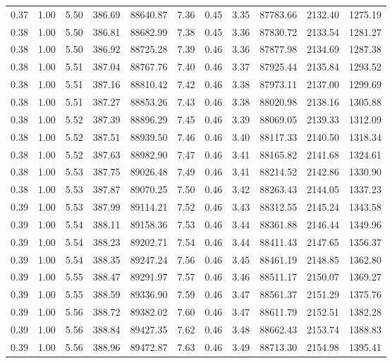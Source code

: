 \begin{table}[!ht]
\begin{tabular}{rrrrrrrrrrr}
0.37 & 1.00 & 5.50 & 386.69 & 88640.87 & 7.36 & 0.45 & 3.35 & 87783.66 & 2132.40 & 1275.19 \\
0.38 & 1.00 & 5.50 & 386.81 & 88682.99 & 7.38 & 0.45 & 3.36 & 87830.72 & 2133.54 & 1281.27 \\
0.38 & 1.00 & 5.50 & 386.92 & 88725.28 & 7.39 & 0.46 & 3.36 & 87877.98 & 2134.69 & 1287.38 \\
0.38 & 1.00 & 5.51 & 387.04 & 88767.76 & 7.40 & 0.46 & 3.37 & 87925.44 & 2135.84 & 1293.52 \\
0.38 & 1.00 & 5.51 & 387.16 & 88810.42 & 7.42 & 0.46 & 3.38 & 87973.11 & 2137.00 & 1299.69 \\
0.38 & 1.00 & 5.51 & 387.27 & 88853.26 & 7.43 & 0.46 & 3.38 & 88020.98 & 2138.16 & 1305.88 \\
0.38 & 1.00 & 5.52 & 387.39 & 88896.29 & 7.45 & 0.46 & 3.39 & 88069.05 & 2139.33 & 1312.09 \\
0.38 & 1.00 & 5.52 & 387.51 & 88939.50 & 7.46 & 0.46 & 3.40 & 88117.33 & 2140.50 & 1318.34 \\
0.38 & 1.00 & 5.52 & 387.63 & 88982.90 & 7.47 & 0.46 & 3.41 & 88165.82 & 2141.68 & 1324.61 \\
0.38 & 1.00 & 5.53 & 387.75 & 89026.48 & 7.49 & 0.46 & 3.41 & 88214.52 & 2142.86 & 1330.90 \\
0.38 & 1.00 & 5.53 & 387.87 & 89070.25 & 7.50 & 0.46 & 3.42 & 88263.43 & 2144.05 & 1337.23 \\
0.39 & 1.00 & 5.53 & 387.99 & 89114.21 & 7.52 & 0.46 & 3.43 & 88312.55 & 2145.24 & 1343.58 \\
0.39 & 1.00 & 5.54 & 388.11 & 89158.36 & 7.53 & 0.46 & 3.44 & 88361.88 & 2146.44 & 1349.96 \\
0.39 & 1.00 & 5.54 & 388.23 & 89202.71 & 7.54 & 0.46 & 3.44 & 88411.43 & 2147.65 & 1356.37 \\
0.39 & 1.00 & 5.54 & 388.35 & 89247.24 & 7.56 & 0.46 & 3.45 & 88461.19 & 2148.85 & 1362.80 \\
0.39 & 1.00 & 5.55 & 388.47 & 89291.97 & 7.57 & 0.46 & 3.46 & 88511.17 & 2150.07 & 1369.27 \\
0.39 & 1.00 & 5.55 & 388.59 & 89336.90 & 7.59 & 0.46 & 3.47 & 88561.37 & 2151.29 & 1375.76 \\
0.39 & 1.00 & 5.56 & 388.72 & 89382.02 & 7.60 & 0.46 & 3.47 & 88611.79 & 2152.51 & 1382.28 \\
0.39 & 1.00 & 5.56 & 388.84 & 89427.35 & 7.62 & 0.46 & 3.48 & 88662.43 & 2153.74 & 1388.83 \\
0.39 & 1.00 & 5.56 & 388.96 & 89472.87 & 7.63 & 0.46 & 3.49 & 88713.30 & 2154.98 & 1395.41 \\

\end{tabular}
\end{table}
